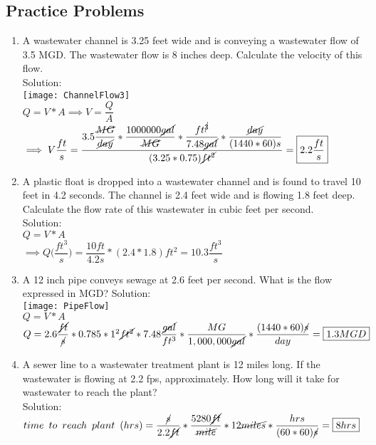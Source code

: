 \documentclass{article}
\begin{document}
\subsection{Practice Problems} 

\begin{enumerate}
\item A wastewater channel is 3.25 feet wide and is conveying a wastewater flow of 3.5 MGD. The wastewater flow is 8 inches deep. Calculate the velocity of this flow.\\
Solution:\\
\texttt{[image: ChannelFlow3]}\\
$Q=V*A \implies V=\dfrac{Q}{A}$\\
$\implies V\dfrac{ft}{s}=\dfrac{3.5\dfrac{\cancel{MG}}{\cancel{day}}*\dfrac{1000000\cancel{gal}}{\cancel{MG}}*\dfrac{ft^{\cancel{3}}}{7.48\cancel{gal}}*\dfrac{\cancel{day}}{(1440*60)s}}{(3.25*0.75)\cancel{ft^2}}=\boxed{2.2\dfrac{ft}{s}}$

\item A plastic float is dropped into a wastewater channel and is found to travel 10 feet in 4.2 seconds. The channel is 2.4 feet wide and is flowing 1.8 feet deep. Calculate the flow rate of this wastewater in cubic feet per second.\\
Solution:\\
$Q=V*A$\\
$\implies Q\Big(\dfrac{ft^3}{s}\Big)=\dfrac{10ft}{4.2s}*(2.4*1.8)ft^2=\boxed{10.3\dfrac{ft^3}{s}}$
\item A 12 inch pipe conveys sewage at 2.6 feet per second.  What is the flow expressed in MGD?
Solution:\\
\texttt{[image: PipeFlow]}\\
$Q=V*A$\\
$Q=2.6\dfrac{\cancel{ft}}{\cancel{s}}*0.785*1^2\cancel{ft^2}*7.48\dfrac{\cancel{gal}}{ft^3}*\dfrac{MG}{1,000,000\cancel{gal}}*\dfrac{(1440*60)\cancel{s}}{day}=\boxed{1.3MGD}$\\

\item A sewer line to a wastewater treatment plant is 12 miles long. If the wastewater is flowing at 2.2 fps, approximately.  How long will it take for wastewater to reach the plant?\\
Solution:\\
$time \enspace to \enspace reach \enspace plant \enspace (hrs)=\dfrac{\cancel{s}}{2.2\cancel{ft}}*\dfrac{5280\cancel{ft}}{\cancel{mile}}*12\cancel{miles}*\dfrac{hrs}{(60*60)\cancel{s}}=\boxed{8hrs}$  
\end{enumerate}
\newpage
\end{document}
